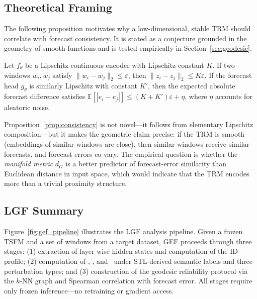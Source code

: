 \subsection{Theoretical Framing}
\label{sec:proposition}

The following proposition motivates why a low-dimensional, stable TRM
should correlate with forecast consistency.
It is stated as a conjecture grounded in the geometry of smooth functions
and is tested empirically in Section~\ref{sec:geodesic}.

\begin{proposition}
\label{prop:consistency}
Let $f_\theta$ be a Lipschitz-continuous encoder with Lipschitz constant $K$.
If two windows $w_i, w_j$ satisfy $\|w_i - w_j\|_2 \leq \varepsilon$,
then $\|z_i - z_j\|_2 \leq K\varepsilon$.
If the forecast head $g_\theta$ is similarly Lipschitz with constant $K'$,
then the expected absolute forecast difference satisfies
$\mathbb{E}[|e_i - e_j|] \leq (K + K')\varepsilon + \eta$,
where $\eta$ accounts for aleatoric noise.
\end{proposition}

Proposition~\ref{prop:consistency} is not novel---it follows from elementary
Lipschitz composition---but it makes the geometric claim precise:
if the TRM is smooth (embeddings of similar windows are close), then similar
windows receive similar forecasts, and forecast errors co-vary.
The empirical question is whether the \emph{manifold metric} $d_G$ is a better
predictor of forecast-error similarity than Euclidean distance in input space,
which would indicate that the TRM encodes more than a trivial proximity
structure.

\subsection{LGF Summary}
\label{sec:lgf_summary}

Figure~\ref{fig:gef_pipeline} illustrates the LGF analysis pipeline.
Given a frozen TSFM and a set of windows from a target dataset, GEF
proceeds through three stages: (1) extraction of layer-wise hidden states
and computation of the ID profile; (2) computation of \lcs, \tsi, and \gsp\
under STL-derived semantic labels and three perturbation types; and
(3) construction of the geodesic reliability protocol via the $k$-NN graph
and Spearman correlation with forecast error.
All stages require only frozen inference---no retraining or gradient access.

